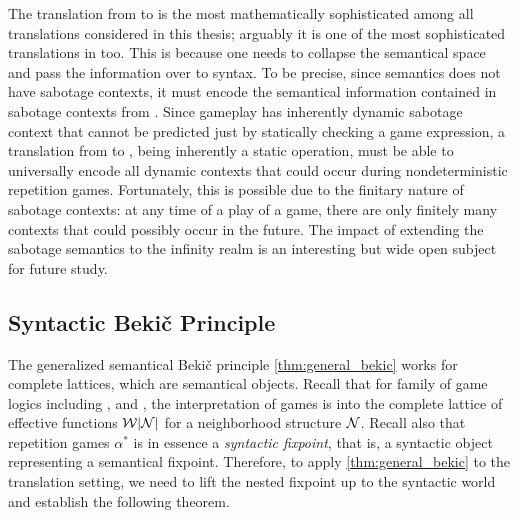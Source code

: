 The translation from \GLs{} to \rlGL{} is the most mathematically sophisticated among all translations considered in this thesis; arguably it is one of the most sophisticated translations in \cite{Wafa_2024} too. This is because one needs to collapse the semantical space and pass the information over to syntax. To be precise, since \rlGL{} semantics does not have sabotage contexts, it must encode the semantical information contained in sabotage contexts from \GLs{}. Since \GLs{} gameplay has inherently dynamic sabotage context that cannot be predicted just by statically checking a game expression, a translation from \GLs{} to \rlGL{}, being inherently a static operation, must be able to universally encode all dynamic contexts that could occur during nondeterministic repetition games. Fortunately, this is possible due to the finitary nature of sabotage contexts: at any time of a play of a \GLs{} game, there are only finitely many contexts that could possibly occur in the future. The impact of extending the sabotage semantics to the infinity realm is an interesting but wide open subject for future study.

\subsection{Syntactic Beki\v{c} Principle}
The generalized semantical Beki\v{c} principle \autoref{thm:general_bekic} works for complete lattices, which are semantical objects. Recall that for family of game logics including \GL{}, \RGL{} and \rlGL{}, the interpretation of games is into the complete lattice of effective functions $\mathcal W|\mathcal N|$ for a neighborhood structure $\mathcal N$. Recall also that repetition games $\alpha^*$ is in essence a \textit{syntactic fixpoint}, that is, a syntactic object representing a semantical fixpoint. Therefore, to apply \autoref{thm:general_bekic} to the translation setting, we need to lift the nested fixpoint up to the syntactic world and establish the following theorem.

